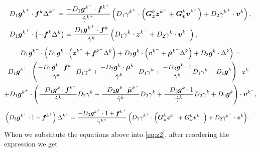 \documentclass[../DC2017114Bouma.tex]{subfiles}
\begin{document}
\begin{align}
&D_1{\boldsymbol{g}}^{k^+}\cdot{\boldsymbol{f}}^{k}\Delta^{k^+} = \frac{-D_1{\boldsymbol{g}}^{k^+}\cdot{\boldsymbol{f}}^{k^+}}{\dot{\gamma}^{k^+}}\left(D_1\gamma^{k^+}\cdot\left({\boldsymbol{G}}_{\boldsymbol{z}}^{k}{\boldsymbol{z}}^{k^-}+{\boldsymbol{G}}_{\boldsymbol{v}}^{k}{\boldsymbol{v}}^{k^-}\right) +D_2\gamma^{k^+}\cdot{\boldsymbol{v}}^{k}\right),\\
&D_1{\boldsymbol{g}}^{k^+}\cdot\left(-{\boldsymbol{f}}^{k}\Delta^{k}\right) = \frac{D_1{\boldsymbol{g}}^{k^+}\cdot{\boldsymbol{f}}^{k}}{\dot{\gamma}^{k}}\left(D_1\gamma^{k}\cdot{\boldsymbol{z}}^{k^-} + D_2\gamma^{k}\cdot{\boldsymbol{v}}^{k^-}\right),
\end{align}
\begin{multline}
D_1{\boldsymbol{g}}^{k^+}\cdot\left(D_1{\boldsymbol{g}}^{k}\cdot\left({\boldsymbol{z}}^{k^-} + {\boldsymbol{f}}^{k^-}\Delta^{k}\right) + D_2{\boldsymbol{g}}^{k}\cdot\left({\boldsymbol{v}}^{k^-}+\dot{\boldsymbol{\mu}}^{k^-}\Delta^{k}\right) + D_3{\boldsymbol{g}}^{k}\cdot\Delta^{k}\right) = \\
D_1{\boldsymbol{g}}^{k^+}\cdot\left(\frac{-D_1{\boldsymbol{g}}^{k}\cdot{\boldsymbol{f}}^{k^-}}{\dot{\gamma}^{k}}D_1\gamma^{k} + \frac{-D_2{\boldsymbol{g}}^{k}\cdot\dot{\boldsymbol{\mu}}^{k^-}}{\dot{\gamma}^{k}}D_1\gamma^{k} + \frac{-D_3{\boldsymbol{g}}^{k}\cdot 1}{\dot{\gamma}^{k}}D_1\gamma^{k} + D_1{\boldsymbol{g}}^{k}\right)\cdot{\boldsymbol{z}}^{k^-} \\
+ D_1{\boldsymbol{g}}^{k^+}\cdot\left(\frac{-D_1{\boldsymbol{g}}^{k}\cdot{\boldsymbol{f}}^{k^-}}{\dot{\gamma}^{k}}D_2\gamma^{k} + \frac{-D_2{\boldsymbol{g}}^{k}\cdot\dot{\boldsymbol{\mu}}^{k^-}}{\dot{\gamma}^{k}}D_2\gamma^{k} + \frac{-D_3{\boldsymbol{g}}^{k}\cdot 1}{\dot{\gamma}^{k}}D_2\gamma^{k} + D_2{\boldsymbol{g}}^{k} \right)\cdot {\boldsymbol{v}}^{k^-},
\end{multline}
\begin{align}
&\left(D_3{\boldsymbol{g}}^{k^+}\cdot 1 - {\boldsymbol{f}}^{k^+}\right)\Delta^{k^+} = \frac{-D_3{\boldsymbol{g}}^{k^+}\cdot 1+{\boldsymbol{f}}^{k^+}}{\dot{\gamma}^{k^+}}\left(D_1\gamma^{k^+}\cdot\left({\boldsymbol{G}}_{\boldsymbol{z}}^{k}{\boldsymbol{z}}^{k^-} + {\boldsymbol{G}}_{\boldsymbol{v}}^{k}{\boldsymbol{v}}^{k^-}\right) + D_2\gamma^{k^+}\cdot{\boldsymbol{v}}^{k}\right).
\end{align}
%
When we substitute the equations above into \eqref{eq:z2}, after reordering the expression we get
\end{document}
